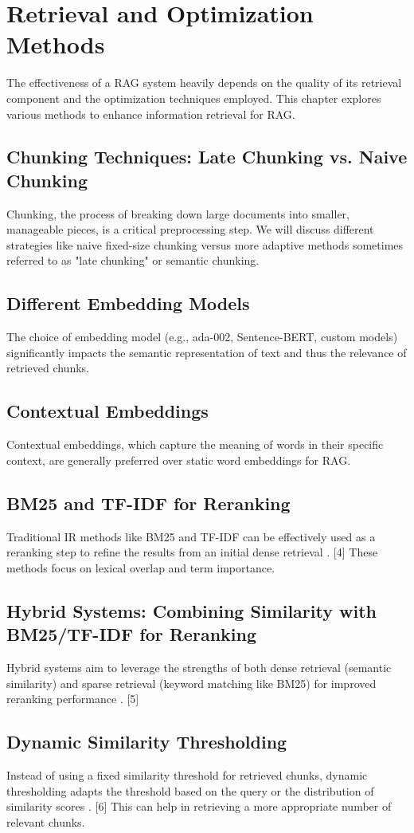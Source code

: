 \chapter{Retrieval and Optimization Methods}
\label{chap:retrieval_optimization}

The effectiveness of a RAG system heavily depends on the quality of its retrieval component and the optimization techniques employed. This chapter explores various methods to enhance information retrieval for RAG.

\section{Chunking Techniques: Late Chunking vs. Naive Chunking}
Chunking, the process of breaking down large documents into smaller, manageable pieces, is a critical preprocessing step. We will discuss different strategies like naive fixed-size chunking versus more adaptive methods sometimes referred to as "late chunking" or semantic chunking.

\section{Different Embedding Models}
The choice of embedding model (e.g., ada-002, Sentence-BERT, custom models) significantly impacts the semantic representation of text and thus the relevance of retrieved chunks.

\section{Contextual Embeddings}
Contextual embeddings, which capture the meaning of words in their specific context, are generally preferred over static word embeddings for RAG.

\section{BM25 and TF-IDF for Reranking}
Traditional IR methods like BM25 and TF-IDF can be effectively used as a reranking step to refine the results from an initial dense retrieval \autocite{llm_ir_survey_2024}. [4] These methods focus on lexical overlap and term importance.

\section{Hybrid Systems: Combining Similarity with BM25/TF-IDF for Reranking}
Hybrid systems aim to leverage the strengths of both dense retrieval (semantic similarity) and sparse retrieval (keyword matching like BM25) for improved reranking performance \autocite{reranking_survey_2025_djoudi}. [5]

\section{Dynamic Similarity Thresholding}
Instead of using a fixed similarity threshold for retrieved chunks, dynamic thresholding adapts the threshold based on the query or the distribution of similarity scores \autocite{dynamic_thresholding_dell_2023}. [6] This can help in retrieving a more appropriate number of relevant chunks.